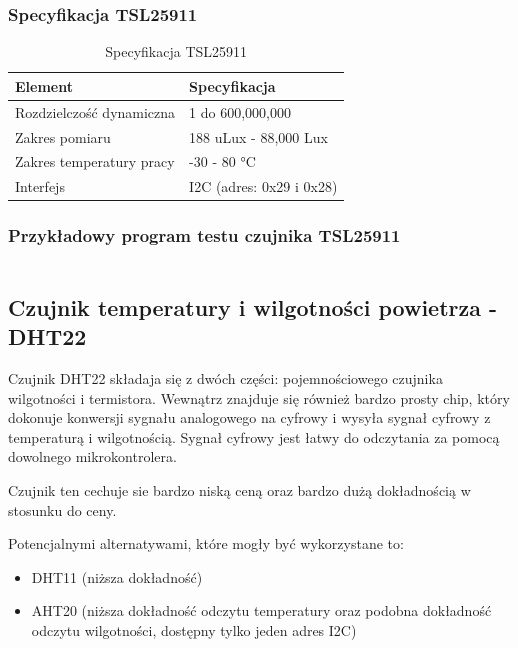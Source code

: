 \documentclass[12pt,a4paper]{article}
\begin{document}
\subsubsection{Specyfikacja TSL25911}

\begin{table}[H]
    \centering
    \begin{tabular}{|l|l|}
        \hline
        Element & Specyfikacja \\
        \hline
        Rozdzielczość dynamiczna & 1 do 600,000,000 \\
        \hline
        Zakres pomiaru & 188 uLux - 88,000 Lux \\
        \hline
        Zakres temperatury pracy & -30 - 80 °C \\
        \hline
        Interfejs & I2C (adres: 0x29 i 0x28)\\
        \hline
    \end{tabular}
    \caption{Specyfikacja TSL25911}
    \label{tsl25911-spec}
\end{table}

\subsubsection{Przykładowy program testu czujnika TSL25911}

\begin{code}[H]
\inputminted[frame=lines,]{c}{../proj/tsl2591-test/tsl2591-test.ino}

\caption{Test czujnika TSL25911}
\end{code}

\subsection{Czujnik temperatury i wilgotności powietrza - DHT22}

Czujnik DHT22 składaja się z dwóch części: pojemnościowego czujnika wilgotności i termistora. 
Wewnątrz znajduje się również bardzo prosty chip, który dokonuje konwersji sygnału analogowego na cyfrowy i wysyła sygnał cyfrowy z temperaturą i wilgotnością. 
Sygnał cyfrowy jest łatwy do odczytania za pomocą dowolnego mikrokontrolera.

Czujnik ten cechuje sie bardzo niską ceną oraz bardzo dużą dokładnością w stosunku do ceny.

Potencjalnymi alternatywami, które mogły być wykorzystane to:
\begin{itemize}
    \item DHT11 (niższa dokładność)
    \item AHT20 (niższa dokładność odczytu temperatury oraz podobna dokładność odczytu wilgotności, dostępny tylko jeden adres I2C)
\end{itemize}
\end{document}
